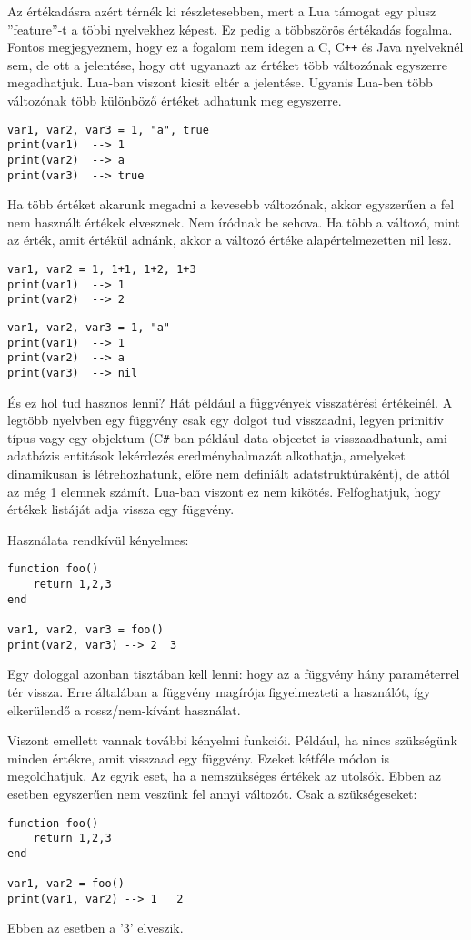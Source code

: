 Az értékadásra azért térnék ki részletesebben, mert a Lua támogat egy plusz ''feature''-t a többi nyelvekhez képest. Ez pedig a többszörös értékadás fogalma. Fontos megjegyeznem, hogy ez a fogalom nem idegen a C, C\verb|++| és Java nyelveknél sem, de ott a jelentése, hogy ott ugyanazt az értéket több változónak egyszerre megadhatjuk. Lua-ban viszont kicsit eltér a jelentése. Ugyanis Lua-ben több változónak több különböző értéket adhatunk meg egyszerre. 
\scriptsize
\begin{lstlisting}
var1, var2, var3 = 1, "a", true
print(var1)  --> 1
print(var2)  --> a
print(var3)  --> true
\end{lstlisting}
\normalsize
Ha több értéket akarunk megadni a kevesebb változónak, akkor egyszerűen a fel nem használt értékek elvesznek. Nem íródnak be sehova. Ha több a változó, mint az érték, amit értékül adnánk, akkor a változó értéke alapértelmezetten nil lesz.
\scriptsize
\begin{lstlisting}
var1, var2 = 1, 1+1, 1+2, 1+3
print(var1)  --> 1
print(var2)  --> 2
\end{lstlisting}
\begin{lstlisting}
var1, var2, var3 = 1, "a"
print(var1)  --> 1
print(var2)  --> a
print(var3)  --> nil
\end{lstlisting}
\normalsize
És ez hol tud hasznos lenni? Hát például a függvények visszatérési értékeinél. A legtöbb nyelvben egy függvény csak egy dolgot tud visszaadni, legyen primitív típus vagy egy objektum (C\verb|#|-ban például data objectet is visszaadhatunk, ami adatbázis entitások lekérdezés eredményhalmazát alkothatja, amelyeket dinamikusan is létrehozhatunk, előre nem definiált adatstruktúraként), de attól az még 1 elemnek számít. Lua-ban viszont ez nem kikötés. Felfoghatjuk, hogy értékek listáját adja vissza egy függvény.

Használata rendkívül kényelmes:
\scriptsize
\begin{lstlisting}
function foo()
	return 1,2,3
end

var1, var2, var3 = foo()
print(var2, var3) --> 2  3
\end{lstlisting}
\normalsize
Egy dologgal azonban tisztában kell lenni: hogy az a függvény hány paraméterrel tér vissza. Erre általában a függvény magírója figyelmezteti a használót, így elkerülendő a rossz/nem-kívánt használat.

Viszont emellett vannak további kényelmi funkciói. Például, ha nincs szükségünk minden értékre, amit visszaad egy függvény. Ezeket kétféle módon is megoldhatjuk. Az egyik eset, ha a nemszükséges értékek az utolsók. Ebben az esetben egyszerűen nem veszünk fel annyi változót. Csak a szükségeseket:
\scriptsize
\begin{lstlisting}
function foo()
	return 1,2,3
end

var1, var2 = foo()
print(var1, var2) --> 1   2
\end{lstlisting}
\normalsize
Ebben az esetben a '3' elveszik. 

